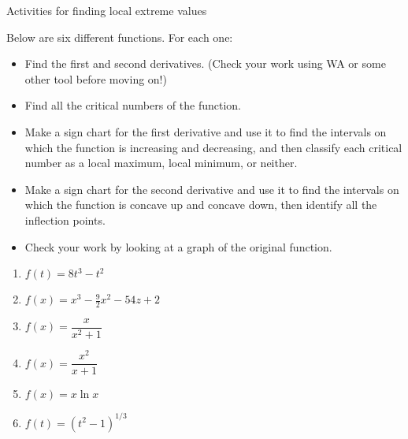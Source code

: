 \documentclass[11pt]{article}
\begin{document}
\begin{center}
    \Large{Activities for finding local extreme values}
\end{center}

Below are six different functions. For each one: 
\begin{itemize}
    \item Find the first and second derivatives. (Check your work using WA or some other tool before moving on!)
    \item Find all the critical numbers of the function.
    \item Make a sign chart for the first derivative and use it to find the intervals on which the function is increasing and decreasing, and then classify each critical number as a local maximum, local minimum, or neither.
    \item Make a sign chart for the second derivative and use it to find the intervals on which the function is concave up and concave down, then identify all the inflection points. 
    \item Check your work by looking at a graph of the original function. 
\end{itemize}

\vspace{0.5in}

\begin{enumerate}
    \item $f(t) = 8t^3 - t^2$
    \item $f(x) = x^3 - \frac{9}{2}x^2 - 54z + 2$
    \item $f(x) = \dfrac{x}{x^2 + 1}$
    \item $f(x) = \dfrac{x^2}{x + 1}$
    \item $f(x) = x \ln x$
    \item $f(t) = (t^2 - 1)^{1/3}$
\end{enumerate}
\end{document}
